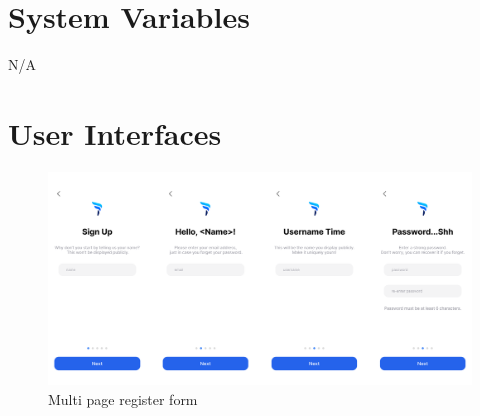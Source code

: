 \documentclass[12pt, titlepage]{article}
\begin{document}
	\section{System Variables}
	N/A
	
	
	
	
	\section{User Interfaces}

  \begin{figure}[H]
		\centering
		\includegraphics[width=\linewidth,keepaspectratio]{register_stack}
		\caption{Multi page register form}
	\end{figure}
\end{document}
